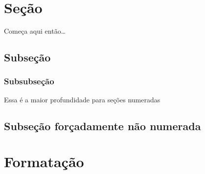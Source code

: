 \newcommand{\teorema}[2]{\begin{theorem}{#1}{th} \textbf{Demonstração.}\\ #2 \qed \end{theorem}}
\newcommand{\corolario}[2]{\begin{coro}{#1}{cr} \textbf{Demonstração.}\\ #2 \qed \end{coro}}
\newcommand{\lema}[2]{\begin{lemma}{#1}{lm} \textbf{Demonstração.}\\ #2 \qed \end{lemma}}
\newcommand{\definicao}[2]{\begin{define}{#1}{lm}  #2 \end{define}}
\newcommand{\problema}[3]{\begin{problem}{#1}{lm} \textbf{Entrada:}  \textit{#2} \\ \textbf{Questão:} #3  \end{problem}}
\newpage

\hypertarget{seuxe7uxe3o}{%
\section{Seção}\label{seuxe7uxe3o}}

Começa aqui então\ldots{}

\hypertarget{subseuxe7uxe3o}{%
\subsection{Subseção}\label{subseuxe7uxe3o}}

\hypertarget{subsubseuxe7uxe3o}{%
\subsubsection{Subsubseção}\label{subsubseuxe7uxe3o}}

Essa é a maior profundidade para seções numeradas

\hypertarget{subseuxe7uxe3o-foruxe7adamente-nuxe3o-numerada}{%
\subsection*{Subseção forçadamente não
numerada}\label{subseuxe7uxe3o-foruxe7adamente-nuxe3o-numerada}}

\hypertarget{formatauxe7uxe3o}{%
\section{Formatação}\label{formatauxe7uxe3o}}

